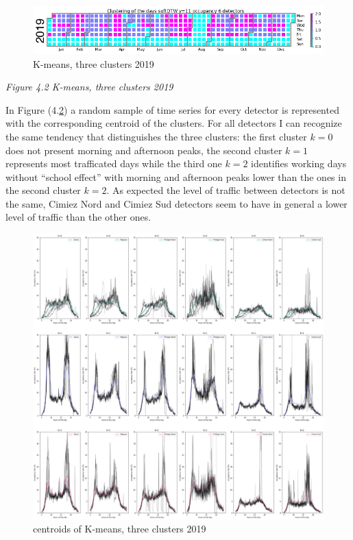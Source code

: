 \documentclass[11pt]{article}
\begin{document}
    \begin{figure}
    \centering
    \includegraphics{softDTW K=3 2019.png}
    \caption{ K-means, three clusters 2019}
    \label{fig:4.2}
\end{figure}

\emph{\small Figure 4.2 K-means, three clusters 2019}

    In Figure (4.\ref{fig:4.3}) a random sample of time series for every
detector is represented with the corresponding centroid of the clusters.
For all detectors I can recognize the same tendency that distinguishes
the three clusters: the first cluster \(k=0\) does not present morning
and afternoon peaks, the second cluster \(k=1\) represents most
trafficated days while the third one \(k=2\) identifies working days
without ``school effect'' with morning and afternoon peaks lower than
the ones in the second cluster \(k=2\). As expected the level of traffic
between detectors is not the same, Cimiez Nord and Cimiez Sud detectors
seem to have in general a lower level of traffic than the other ones.

    \begin{figure}
    \centering
    \includegraphics{centroids softDTW K=3 2019.png}
    \caption{centroids of K-means, three clusters 2019}
    \label{fig:4.3}
\end{figure}
\end{document}
